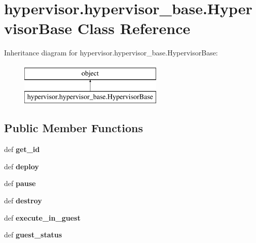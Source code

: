 \hypertarget{classhypervisor_1_1hypervisor__base_1_1HypervisorBase}{\section{hypervisor.\-hypervisor\-\_\-base.\-Hypervisor\-Base Class Reference}
\label{classhypervisor_1_1hypervisor__base_1_1HypervisorBase}
}
Inheritance diagram for hypervisor.\-hypervisor\-\_\-base.\-Hypervisor\-Base\-:\begin{figure}[H]
\begin{center}
\leavevmode
\includegraphics[height=2.000000cm]{classhypervisor_1_1hypervisor__base_1_1HypervisorBase}
\end{center}
\end{figure}
\subsection*{Public Member Functions}
\begin{DoxyCompactItemize}
\item 
\hypertarget{classhypervisor_1_1hypervisor__base_1_1HypervisorBase_aa06a6d5c765f477edc9b2121aa1477f8}{def {\bfseries get\-\_\-id}}\label{classhypervisor_1_1hypervisor__base_1_1HypervisorBase_aa06a6d5c765f477edc9b2121aa1477f8}

\item 
\hypertarget{classhypervisor_1_1hypervisor__base_1_1HypervisorBase_aaaecc9f6059daebb99596f7bae3b4c61}{def {\bfseries deploy}}\label{classhypervisor_1_1hypervisor__base_1_1HypervisorBase_aaaecc9f6059daebb99596f7bae3b4c61}

\item 
\hypertarget{classhypervisor_1_1hypervisor__base_1_1HypervisorBase_ab4147962f621e47480a67da9dbab6ec7}{def {\bfseries pause}}\label{classhypervisor_1_1hypervisor__base_1_1HypervisorBase_ab4147962f621e47480a67da9dbab6ec7}

\item 
\hypertarget{classhypervisor_1_1hypervisor__base_1_1HypervisorBase_a9fb778f97170ab9b0248a5048261f53e}{def {\bfseries destroy}}\label{classhypervisor_1_1hypervisor__base_1_1HypervisorBase_a9fb778f97170ab9b0248a5048261f53e}

\item 
\hypertarget{classhypervisor_1_1hypervisor__base_1_1HypervisorBase_ab73d82fec1cbeadcc3b859310ebcf16e}{def {\bfseries execute\-\_\-in\-\_\-guest}}\label{classhypervisor_1_1hypervisor__base_1_1HypervisorBase_ab73d82fec1cbeadcc3b859310ebcf16e}

\item 
\hypertarget{classhypervisor_1_1hypervisor__base_1_1HypervisorBase_a4891d99be2c92c1082eab91b82a4ddad}{def {\bfseries guest\-\_\-status}}\label{classhypervisor_1_1hypervisor__base_1_1HypervisorBase_a4891d99be2c92c1082eab91b82a4ddad}

\end{DoxyCompactItemize}


